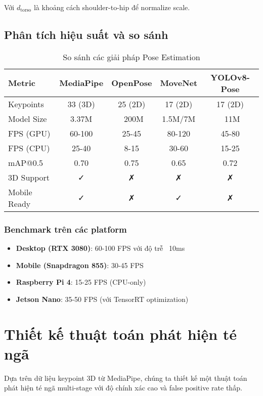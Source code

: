 Với $d_{\text{torso}}$ là khoảng cách shoulder-to-hip để normalize scale.

\subsection{Phân tích hiệu suất và so sánh}

\begin{table}[htbp]
\centering
\caption{So sánh các giải pháp Pose Estimation}
\label{tab:pose_comparison}
\begin{tabular}{|l|c|c|c|c|}
\hline
\textbf{Metric} & \textbf{MediaPipe} & \textbf{OpenPose} & \textbf{MoveNet} & \textbf{YOLOv8-Pose} \\
\hline
Keypoints & 33 (3D) & 25 (2D) & 17 (2D) & 17 (2D) \\
Model Size & 3.37M & ~200M & 1.5M/7M & ~11M \\
FPS (GPU) & 60-100 & 25-45 & 80-120 & 45-80 \\
FPS (CPU) & 25-40 & 8-15 & 30-60 & 15-25 \\
mAP@0.5 & 0.70 & 0.75 & 0.65 & 0.72 \\
3D Support & ✓ & ✗ & ✗ & ✗ \\
Mobile Ready & ✓ & ✗ & ✓ & ✗ \\
\hline
\end{tabular}
\end{table}

\subsubsection{Benchmark trên các platform}
\begin{itemize}
    \item \textbf{Desktop (RTX 3080)}: 60-100 FPS với độ trễ ~10ms
    \item \textbf{Mobile (Snapdragon 855)}: 30-45 FPS
    \item \textbf{Raspberry Pi 4}: 15-25 FPS (CPU-only)
    \item \textbf{Jetson Nano}: 35-50 FPS (với TensorRT optimization)
\end{itemize}

\section{Thiết kế thuật toán phát hiện té ngã}

Dựa trên dữ liệu keypoint 3D từ MediaPipe, chúng ta thiết kế một thuật toán phát hiện té ngã multi-stage với độ chính xác cao và false positive rate thấp.

